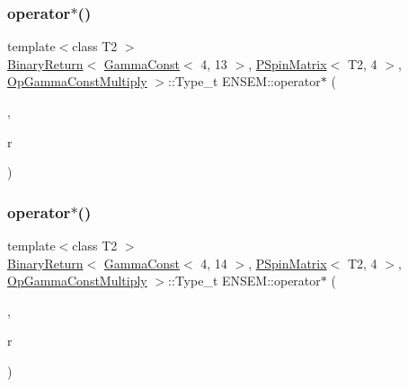 \subsubsection{\texorpdfstring{operator$\ast$()}{operator*()}\hspace{0.1cm}{\footnotesize\ttfamily [14/64]}}
{\footnotesize\ttfamily template$<$class T2 $>$ \\
\mbox{\hyperlink{structENSEM_1_1BinaryReturn}{Binary\+Return}}$<$ \mbox{\hyperlink{classENSEM_1_1GammaConst}{Gamma\+Const}}$<$ 4, 13 $>$, \mbox{\hyperlink{classENSEM_1_1PSpinMatrix}{P\+Spin\+Matrix}}$<$ T2, 4 $>$, \mbox{\hyperlink{structENSEM_1_1OpGammaConstMultiply}{Op\+Gamma\+Const\+Multiply}} $>$\+::Type\+\_\+t E\+N\+S\+E\+M\+::operator$\ast$ (\begin{DoxyParamCaption}\item[{const \mbox{\hyperlink{classENSEM_1_1GammaConst}{Gamma\+Const}}$<$ 4, 13 $>$ \&}]{,  }\item[{const \mbox{\hyperlink{classENSEM_1_1PSpinMatrix}{P\+Spin\+Matrix}}$<$ T2, 4 $>$ \&}]{r }\end{DoxyParamCaption})\hspace{0.3cm}{\ttfamily [inline]}}

\mbox{\label{group__primspinmatrix_ga8b0118f0d96b78f8fbea926daf66af8f}} 
\subsubsection{\texorpdfstring{operator$\ast$()}{operator*()}\hspace{0.1cm}{\footnotesize\ttfamily [15/64]}}
{\footnotesize\ttfamily template$<$class T2 $>$ \\
\mbox{\hyperlink{structENSEM_1_1BinaryReturn}{Binary\+Return}}$<$ \mbox{\hyperlink{classENSEM_1_1GammaConst}{Gamma\+Const}}$<$ 4, 14 $>$, \mbox{\hyperlink{classENSEM_1_1PSpinMatrix}{P\+Spin\+Matrix}}$<$ T2, 4 $>$, \mbox{\hyperlink{structENSEM_1_1OpGammaConstMultiply}{Op\+Gamma\+Const\+Multiply}} $>$\+::Type\+\_\+t E\+N\+S\+E\+M\+::operator$\ast$ (\begin{DoxyParamCaption}\item[{const \mbox{\hyperlink{classENSEM_1_1GammaConst}{Gamma\+Const}}$<$ 4, 14 $>$ \&}]{,  }\item[{const \mbox{\hyperlink{classENSEM_1_1PSpinMatrix}{P\+Spin\+Matrix}}$<$ T2, 4 $>$ \&}]{r }\end{DoxyParamCaption})\hspace{0.3cm}{\ttfamily [inline]}}

